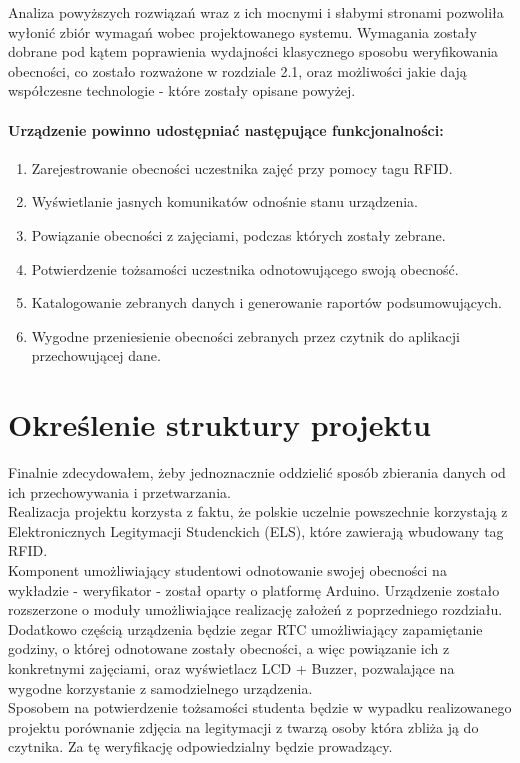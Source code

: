 \documentclass[declaration,shortabstract, mgr]{iithesis}
\begin{document}
\indent Analiza powyższych rozwiązań wraz z ich mocnymi i słabymi stronami pozwoliła wyłonić zbiór wymagań wobec projektowanego systemu. Wymagania zostały dobrane pod kątem poprawienia wydajności klasycznego sposobu weryfikowania obecności, co zostało rozważone w rozdziale 2.1, oraz możliwości jakie dają współczesne technologie - które zostały opisane powyżej.

\subsubsection{Urządzenie powinno udostępniać następujące funkcjonalności:}

\begin{enumerate}
\item Zarejestrowanie obecności uczestnika zajęć przy pomocy tagu RFID.
\item Wyświetlanie jasnych komunikatów odnośnie stanu urządzenia.
\item Powiązanie obecności z zajęciami, podczas których zostały zebrane.
\item Potwierdzenie tożsamości uczestnika odnotowującego swoją obecność.
\item Katalogowanie zebranych danych i generowanie raportów podsumowujących.
\item Wygodne przeniesienie obecności zebranych przez czytnik do aplikacji przechowującej dane.
\end{enumerate}



\chapter{Określenie struktury projektu}
\indent Finalnie zdecydowałem, żeby jednoznacznie oddzielić sposób zbierania danych od ich przechowywania i przetwarzania.\\
\indent Realizacja projektu korzysta z faktu, że polskie uczelnie powszechnie korzystają z Elektronicznych Legitymacji Studenckich (ELS), które zawierają wbudowany tag RFID\cite{rfid}. \\
\indent Komponent umożliwiający studentowi odnotowanie swojej obecności na wykładzie - weryfikator - został oparty o platformę Arduino. Urządzenie zostało rozszerzone o moduły umożliwiające realizację założeń z poprzedniego rozdziału.\\
\indent Dodatkowo częścią urządzenia będzie zegar RTC umożliwiający zapamiętanie godziny, o której odnotowane zostały obecności, a więc powiązanie ich z konkretnymi zajęciami, oraz wyświetlacz LCD + Buzzer, pozwalające na wygodne korzystanie z samodzielnego urządzenia. \\
\indent Sposobem na potwierdzenie tożsamości studenta będzie w wypadku realizowanego projektu porównanie zdjęcia na legitymacji z twarzą osoby która zbliża ją do czytnika. Za tę weryfikację odpowiedzialny będzie prowadzący.\\\\
\end{document}
